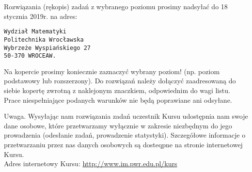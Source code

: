 \documentclass[10pt]{article}
\begin{document}
Rozwiązania (rękopis) zadań z wybranego poziomu prosimy nadsyłać do 18 stycznia 2019r. na adres:

\begin{verbatim}
Wydział Matematyki
Politechnika Wrocławska
Wybrzeże Wyspiańskiego 27
50-370 WROCEAW.
\end{verbatim}

Na kopercie prosimy koniecznie zaznaczyć wybrany poziom! (np. poziom podstawowy lub rozszerzony). Do rozwiązań należy dołączyć zaadresowaną do siebie kopertę zwrotną z naklejonym znaczkiem, odpowiednim do wagi listu. Prace niespełniające podanych warunków nie będą poprawiane ani odsyłane.

Uwaga. Wysyłając nam rozwiązania zadań uczestnik Kursu udostępnia nam swoje dane osobowe, które przetwarzamy wyłącznie w zakresie niezbędnym do jego prowadzenia (odesłanie zadań, prowadzenie statystyki). Szczegółowe informacje o przetwarzaniu przez nas danych osobowych są dosteqpne na stronie internetowej Kursu.\\
Adres internetowy Kursu: \href{http://www.im.pwr.edu.pl/kurs}{http://www.im.pwr.edu.pl/kurs}
\end{document}
